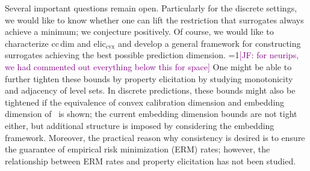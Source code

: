 \documentclass[anon,12pt]{colt2021} %
\newcommand{\Comments}{1}
\newcommand{\mynote}[2]{\ifnum\Comments=1\textcolor{#1}{#2}\fi}
\newcommand{\jessie}[1]{\mynote{purple}{[JF: #1]}}
\newcommand{\reals}{\mathbb{R}}
\newcommand{\eliccvx}{\mathrm{elic}_\mathrm{cvx}}
\newcommand{\ccdim}{\mathrm{cc\,dim}}
\newcommand{\Y}{\mathcal{Y}}
\begin{document}
Several important questions remain open.
Particularly for the discrete settings, we would like to know whether one can lift the restriction that surrogates always achieve a minimum; we conjecture positively.
Of course, we would like to characterize $\ccdim$ and $\eliccvx$ and develop a general framework for constructing surrogates achieving the best possible prediction dimension.
\jessie{for neurips, we had commented out everything below this for space}
One might be able to further tighten these bounds by property elicitation by studying monotonicity and adjacency of level sets.
In discrete predictions, these bounds might also be tightened if the equivalence of convex calibration dimension and embedding dimension of~\citet{finocchiaro2020embedding} is shown; the current embedding dimension bounds are not tight either, but additional structure is imposed by considering the embedding framework.
Moreover, the practical reason why consistency is desired is to ensure the guarantee of empirical risk minimization (ERM) rates; however, the relationship between ERM rates and property elicitation has not been studied.

\newpage
\end{document}
